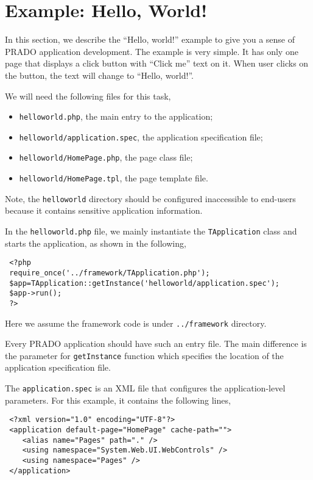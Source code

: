 \documentclass{book}
\begin{document}
\section{Example: Hello, World!}

In this section, we describe the ``Hello, world!'' example to give
you a sense of PRADO application development. The example is very
simple. It has only one page that displays a click button with
``Click me'' text on it. When user clicks on the button, the text
will change to ``Hello, world!''.


We will need the following files for this task,
\begin{itemize}
\item \verb|helloworld.php|, the main entry to the application;

\item \verb|helloworld/application.spec|, the application
specification file;

\item \verb|helloworld/HomePage.php|, the page class file;

\item \verb|helloworld/HomePage.tpl|, the page template file.
\end{itemize}


Note, the \verb|helloworld| directory should be configured
inaccessible to end-users because it contains sensitive
application information.


In the \verb|helloworld.php| file, we mainly instantiate the
\verb|TApplication| class and starts the application, as shown in
the following,
\begin{verbatim}
 <?php
 require_once('../framework/TApplication.php');
 $app=TApplication::getInstance('helloworld/application.spec');
 $app->run();
 ?>
\end{verbatim}
Here we assume the framework code is under \verb|../framework|
directory.

Every PRADO application should have such an entry file. The main
difference is the parameter for \verb|getInstance| function which
specifies the location of the application specification file.


The \verb|application.spec| is an XML file that configures the
application-level parameters. For this example, it contains the
following lines,
\begin{verbatim}
 <?xml version="1.0" encoding="UTF-8"?>
 <application default-page="HomePage" cache-path="">
    <alias name="Pages" path="." />
    <using namespace="System.Web.UI.WebControls" />
    <using namespace="Pages" />
 </application>
\end{verbatim}
\end{document}
